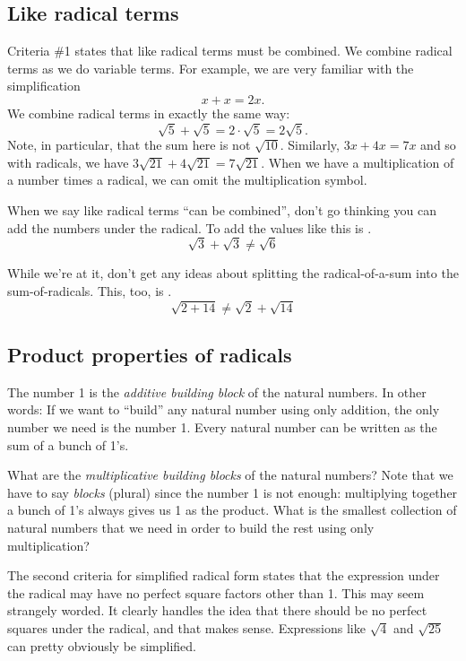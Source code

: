 \subsection{Like radical terms}

Criteria \#1 states that like radical terms must be combined. We combine radical terms as we do variable terms. For example, we are very familiar with the simplification \[x + x = 2x.\] We combine radical terms in exactly the same way: \[\sqrt5 + \sqrt5 = 2\cdot\sqrt5 = 2\sqrt5.\]
Note, in particular, that the sum here is not $\sqrt{10}$. Similarly, $3x + 4x = 7x$ and so with radicals, we have $3\sqrt{21} + 4\sqrt{21} = 7\sqrt{21}$. When we have a multiplication of a number times a radical, we can omit the multiplication symbol.

\begin{boxedwarning}
When we say like radical terms ``can be combined'', don't go thinking you can add the numbers under the radical. To add the values like this is \evilandwrong.
\[ \sqrt{3} + \sqrt{3} \neq \sqrt{6}\]

While we're at it, don't get any ideas about splitting the radical-of-a-sum into the sum-of-radicals. This, too, is \evilandwrong.
\[\sqrt{2+14} \neq \sqrt{2} +\sqrt{14}\]
\end{boxedwarning}


\subsection{Product properties of radicals}

\begin{boxedexplore}
The number 1 is the \textit{additive building block} of the natural numbers. In other words: If we want to ``build'' any natural number using only addition, the only number we need is the number 1. Every natural number can be written as the sum of a bunch of 1's.

What are the \textit{multiplicative building blocks} of the natural numbers? Note that we have to say \textit{blocks} (plural) since the number 1 is not enough: multiplying together a bunch of 1's always gives us 1 as the product. What is the smallest collection of natural numbers that we need in order to build the rest using only multiplication?
\end{boxedexplore}

The second criteria for simplified radical form states that the expression under the radical may have no perfect square factors other than 1. This may seem strangely worded. It clearly handles the idea that there should be no perfect squares under the radical, and that makes sense. Expressions like $\sqrt{4}$ and $\sqrt{25}$ can pretty obviously be simplified.

